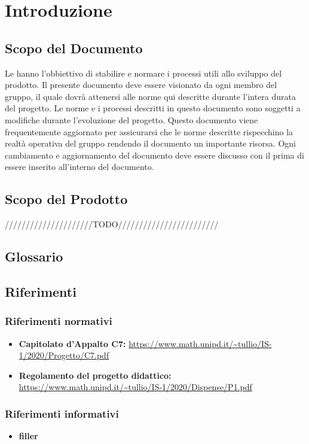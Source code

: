 \section{Introduzione}
\subsection{Scopo del Documento}
Le \NdP{} hanno l'obbiettivo di stabilire e normare i processi utili allo sviluppo del prodotto.
Il presente documento deve essere visionato da ogni membro del gruppo, il quale dovrà attenersi alle norme qui descritte durante l'intera durata del progetto.
Le norme e i processi descritti in questo documento sono soggetti a modifiche durante l'evoluzione del progetto.
Questo documento viene frequentemente aggiornato per assicurarsi che le norme descritte rispecchino la realtà operativa del gruppo rendendo il documento un importante risorsa.
Ogni cambiamento e aggiornamento del documento deve essere discusso con il \RdP{} prima di essere inserito all'interno del documento.
\subsection{Scopo del Prodotto}
/////////////////////TODO////////////////////////
\subsection{Glossario}


\subsection{Riferimenti}
\subsubsection{Riferimenti normativi}
\begin{itemize}
	\item \textbf{Capitolato d'Appalto C7:} \url{https://www.math.unipd.it/~tullio/IS-1/2020/Progetto/C7.pdf}
	\item \textbf{Regolamento del progetto didattico:} \url{https://www.math.unipd.it/~tullio/IS-1/2020/Dispense/P1.pdf}
\end{itemize}
\subsubsection{Riferimenti informativi}
\begin{itemize}
	\item \textbf{filler}
\end{itemize}
